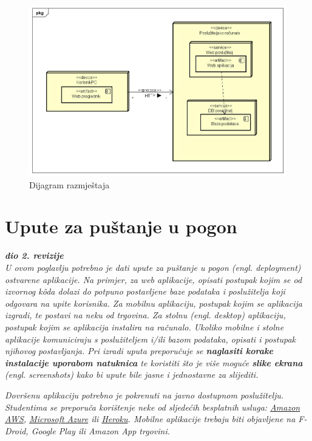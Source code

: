 			\begin{figure}[H]
				\includegraphics[scale=0.3]{slike/Dijagram razmjestaja}
				\centering
				\caption{Dijagram razmještaja}
				\label{fig:razmijestaja}
			\end{figure}

			\eject 
		
		\section{Upute za puštanje u pogon}
		
			\textbf{\textit{dio 2. revizije}}\\
		
			 \textit{U ovom poglavlju potrebno je dati upute za puštanje u pogon (engl. deployment) ostvarene aplikacije. Na primjer, za web aplikacije, opisati postupak kojim se od izvornog kôda dolazi do potpuno postavljene baze podataka i poslužitelja koji odgovara na upite korisnika. Za mobilnu aplikaciju, postupak kojim se aplikacija izgradi, te postavi na neku od trgovina. Za stolnu (engl. desktop) aplikaciju, postupak kojim se aplikacija instalira na računalo. Ukoliko mobilne i stolne aplikacije komuniciraju s poslužiteljem i/ili bazom podataka, opisati i postupak njihovog postavljanja. Pri izradi uputa preporučuje se \textbf{naglasiti korake instalacije uporabom natuknica} te koristiti što je više moguće \textbf{slike ekrana} (engl. screenshots) kako bi upute bile jasne i jednostavne za slijediti.}
			
			
			 \textit{Dovršenu aplikaciju potrebno je pokrenuti na javno dostupnom poslužitelju. Studentima se preporuča korištenje neke od sljedećih besplatnih usluga: \href{https://aws.amazon.com/}{Amazon AWS}, \href{https://azure.microsoft.com/en-us/}{Microsoft Azure} ili \href{https://www.heroku.com/}{Heroku}. Mobilne aplikacije trebaju biti objavljene na F-Droid, Google Play ili Amazon App trgovini.}

